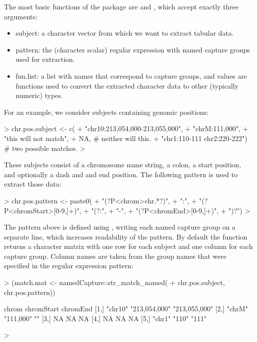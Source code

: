 The most basic functions of the  package
are  and , which accept exactly three arguments:
\begin{itemize}
\item subject: a character vector from which we want to extract
  tabular data.
\item pattern: the (character scalar) regular expression with named
  capture groups used for extraction.
\item fun.list: a list with names that correspond to capture groups,
  and values are functions used to convert the extracted character
  data to other (typically numeric) types.
\end{itemize}

For an example, we consider subjects containing genomic positions:

\begin{Schunk}
\begin{Sinput}
> chr.pos.subject <- c(
+   "chr10:213,054,000-213,055,000",
+   "chrM:111,000",
+   "this will not match",
+   NA, # neither will this.
+   "chr1:110-111 chr2:220-222") # two possible matches.
> 
\end{Sinput}
\end{Schunk}

These subjects consist of a chromosome name string, a colon, a start
position, and optionally a dash and and end position. The following
pattern is used to extract those data:

\begin{Schunk}
\begin{Sinput}
> chr.pos.pattern <- paste0(
+   "(?P<chrom>chr.*?)",
+   ":",
+   "(?P<chromStart>[0-9,]+)",
+   "(?:",
+     "-",
+     "(?P<chromEnd>[0-9,]+)",
+   ")?")
> 
\end{Sinput}
\end{Schunk}

The pattern above is defined using , writing each named capture
group on a separate line, which increases readability of the pattern.
By default
the  function returns a character matrix with
one row for each subject and one column for each capture group. Column
names are taken from the group names that were specified in the
regular expression pattern:

\begin{Schunk}
\begin{Sinput}
> (match.mat <- namedCapture::str_match_named(
+   chr.pos.subject, chr.pos.pattern))
\end{Sinput}
\begin{Soutput}
     chrom   chromStart    chromEnd     
[1,] "chr10" "213,054,000" "213,055,000"
[2,] "chrM"  "111,000"     ""           
[3,] NA      NA            NA           
[4,] NA      NA            NA           
[5,] "chr1"  "110"         "111"        
\end{Soutput}
\begin{Sinput}
> 
\end{Sinput}
\end{Schunk}


